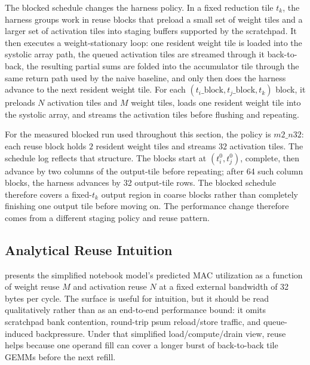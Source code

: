 The blocked schedule changes the harness policy. In a fixed reduction tile $t_k$, the harness groups work in reuse blocks that preload a small set of weight tiles and a larger set of activation tiles into staging buffers supported by the scratchpad. It then executes a weight-stationary loop: one resident weight tile is loaded into the systolic array path, the queued activation tiles are streamed through it back-to-back, the resulting partial sums are folded into the accumulator tile through the same return path used by the naive baseline, and only then does the harness advance to the next resident weight tile. For each $(t_i\_\text{block}, t_j\_\text{block}, t_k)$ block, it preloads $N$ activation tiles and $M$ weight tiles, loads one resident weight tile into the systolic array, and streams the activation tiles before flushing and repeating.

For the measured blocked run used throughout this section, the policy is $m2\_n32$: each reuse block holds $2$ resident weight tiles and streams $32$ activation tiles. The schedule log reflects that structure. The blocks start at $(t_i^0, t_j^0)$, complete, then advance by two columns of the output-tile before repeating; after 64 such column blocks, the harness advances by 32 output-tile rows. The blocked schedule therefore covers a fixed-$t_k$ output region in coarse blocks rather than completely finishing one output tile before moving on. The performance change therefore comes from a different staging policy and reuse pattern.

\subsection{Analytical Reuse Intuition}

 presents the simplified notebook model's predicted MAC utilization as a function of weight reuse $M$ and activation reuse $N$ at a fixed external bandwidth of 32 bytes per cycle. The surface is useful for intuition, but it should be read qualitatively rather than as an end-to-end performance bound: it omits scratchpad bank contention, round-trip psum reload/store traffic, and queue-induced backpressure. Under that simplified load/compute/drain view, reuse helps because one operand fill can cover a longer burst of back-to-back tile GEMMs before the next refill.

